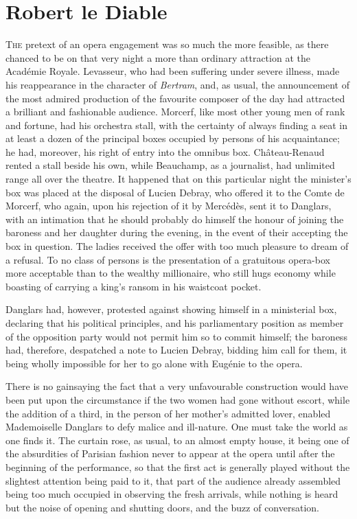\chapter{Robert le Diable} 

 \lettrine{T}{he} pretext of an opera engagement was so much the more feasible, as there chanced to be on that very night a more than ordinary attraction at the Académie Royale. Levasseur, who had been suffering under severe illness, made his reappearance in the character of \textit{Bertram}, and, as usual, the announcement of the most admired production of the favourite composer of the day had attracted a brilliant and fashionable audience. Morcerf, like most other young men of rank and fortune, had his orchestra stall, with the certainty of always finding a seat in at least a dozen of the principal boxes occupied by persons of his acquaintance; he had, moreover, his right of entry into the omnibus box. Château-Renaud rented a stall beside his own, while Beauchamp, as a journalist, had unlimited range all over the theatre. It happened that on this particular night the minister's box was placed at the disposal of Lucien Debray, who offered it to the Comte de Morcerf, who again, upon his rejection of it by Mercédès, sent it to Danglars, with an intimation that he should probably do himself the honour of joining the baroness and her daughter during the evening, in the event of their accepting the box in question. The ladies received the offer with too much pleasure to dream of a refusal. To no class of persons is the presentation of a gratuitous opera-box more acceptable than to the wealthy millionaire, who still hugs economy while boasting of carrying a king's ransom in his waistcoat pocket. 

 Danglars had, however, protested against showing himself in a ministerial box, declaring that his political principles, and his parliamentary position as member of the opposition party would not permit him so to commit himself; the baroness had, therefore, despatched a note to Lucien Debray, bidding him call for them, it being wholly impossible for her to go alone with Eugénie to the opera. 

 There is no gainsaying the fact that a very unfavourable construction would have been put upon the circumstance if the two women had gone without escort, while the addition of a third, in the person of her mother's admitted lover, enabled Mademoiselle Danglars to defy malice and ill-nature. One must take the world as one finds it.  The curtain rose, as usual, to an almost empty house, it being one of the absurdities of Parisian fashion never to appear at the opera until after the beginning of the performance, so that the first act is generally played without the slightest attention being paid to it, that part of the audience already assembled being too much occupied in observing the fresh arrivals, while nothing is heard but the noise of opening and shutting doors, and the buzz of conversation. 

